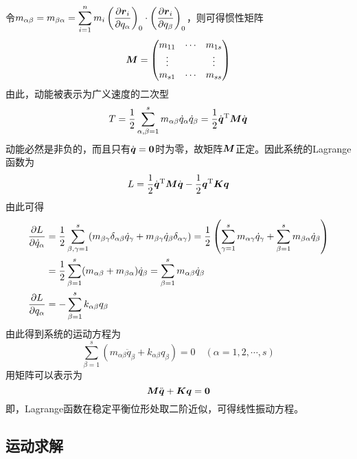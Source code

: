 令$\displaystyle m_{\alpha\beta} = m_{\beta\alpha} = \sum_{i=1}^n m_i \left(\frac{\partial \boldsymbol{r}_i}{\partial q_\alpha}\right)_0 \cdot \left(\frac{\partial \boldsymbol{r}_i}{\partial q_\beta}\right)_0$，则可得惯性矩阵
\begin{equation*}
	\boldsymbol{M} = \begin{pmatrix} m_{11} & \cdots & m_{1s} \\ \vdots & & \vdots \\ m_{s1} & \cdots & m_{ss} \end{pmatrix}
\end{equation*}
由此，动能被表示为广义速度的二次型
\begin{equation}
	T = \frac12 \sum_{\alpha,\beta=1}^s m_{\alpha\beta} \dot{q}_\alpha \dot{q}_\beta = \frac12 \dot{\boldsymbol{q}}^{\mathrm{T}} \boldsymbol{M} \dot{\boldsymbol{q}}
\end{equation}
动能必然是非负的，而且只有$\dot{\boldsymbol{q}}=\boldsymbol{0}$时为零，故矩阵$\boldsymbol{M}$正定。因此系统的Lagrange函数为
\begin{equation}
	L = \frac12 \dot{\boldsymbol{q}}^{\mathrm{T}} \boldsymbol{M} \dot{\boldsymbol{q}} - \frac12 \boldsymbol{q}^{\mathrm{T}} \boldsymbol{K} \boldsymbol{q}
\end{equation}
由此可得
\begin{align*}
	\frac{\partial L}{\partial \dot{q}_\alpha} & = \frac12 \sum_{\beta,\gamma=1}^s (m_{\beta\gamma}\delta_{\alpha\beta} \dot{q}_\gamma + m_{\beta\gamma}\dot{q}_\beta \delta_{\alpha\gamma}) = \frac12 \left(\sum_{\gamma=1}^s m_{\alpha\gamma} \dot{q}_\gamma + \sum_{\beta=1}^s m_{\beta\alpha} \dot{q}_\beta\right) \\
	& = \frac12 \sum_{\beta=1}^s (m_{\alpha\beta} + m_{\beta\alpha}) \dot{q}_\beta = \sum_{\beta=1}^s m_{\alpha\beta} \dot{q}_\beta \\
	\frac{\partial L}{\partial q_\alpha} & = -\sum_{\beta=1}^s k_{\alpha\beta} q_\beta
\end{align*}
由此得到系统的运动方程为
\begin{equation}
	\sum_{\beta=1}^s (m_{\alpha\beta} \ddot{q}_\beta + k_{\alpha\beta} q_\beta) = 0 \quad (\alpha=1,2,\cdots,s)
\end{equation}
用矩阵可以表示为
\begin{equation}
	\boldsymbol{M} \ddot{\boldsymbol{q}} + \boldsymbol{K} \boldsymbol{q} = \boldsymbol{0}
	\label{多自由度微振动系统的运动方程}
\end{equation}
即，Lagrange函数在稳定平衡位形处取二阶近似，可得线性振动方程。

\subsection{运动求解}

